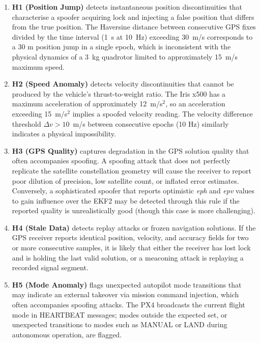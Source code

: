 \documentclass[electronics,article,accept,moreauthors]{Definitions/mdpi}
\begin{document}
\begin{enumerate}
    \item \textbf{H1 (Position Jump)} detects instantaneous position discontinuities that characterise a spoofer acquiring lock and injecting a false position that differs from the true position. The Haversine distance between consecutive GPS fixes divided by the time interval (1~s at 10~Hz) exceeding 30~m/s corresponds to a 30 m position jump in a single epoch, which is inconsistent with the physical dynamics of a 3~kg quadrotor limited to approximately 15~m/s maximum speed.
 
    \item \textbf{H2 (Speed Anomaly)} detects velocity discontinuities that cannot be produced by the vehicle's thrust-to-weight ratio. The Iris x500 has a maximum acceleration of approximately 12~m/s$^2$, so an acceleration exceeding 15~m/s$^2$ implies a spoofed velocity reading. The velocity difference threshold $\Delta v > 10$~m/s between consecutive epochs (10 Hz) similarly indicates a physical impossibility.

    \item \textbf{H3 (GPS Quality)} captures degradation in the GPS solution quality that often accompanies spoofing. A spoofing attack that does not perfectly replicate the satellite constellation geometry will cause the receiver to report poor dilution of precision, low satellite count, or inflated error estimates. Conversely, a sophisticated spoofer that reports optimistic {\it eph} and {\it epv} values to gain influence over the EKF2 may be detected through this rule if the reported quality is unrealistically good (though this case is more challenging).

    \item \textbf{H4 (Stale Data)} detects replay attacks or frozen navigation solutions. If the GPS receiver reports identical position, velocity, and accuracy fields for two or more consecutive samples, it is likely that either the receiver has lost lock and is holding the last valid solution, or a meaconing attack is replaying a recorded signal segment.

    \item \textbf{H5 (Mode Anomaly)} flags unexpected autopilot mode transitions that may indicate an external takeover via mission command injection, which often accompanies spoofing attacks. The PX4 broadcasts the current flight mode in HEARTBEAT messages; modes outside the expected set, or unexpected transitions to modes such as MANUAL or LAND during autonomous operation, are flagged.


\end{enumerate}
\end{document}
